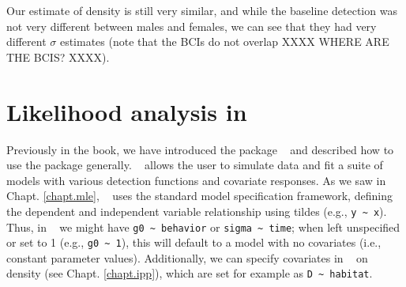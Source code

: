 Our estimate of density is still very similar, and while the baseline detection was not very different
between males and females, we can see that they had very different $\sigma$ estimates (note that the BCIs do not
overlap XXXX WHERE ARE THE BCIS? XXXX).  




\section{Likelihood analysis in \secr}

\begin{comment}
XXX THIS ENTIRE PARAGRAPH IS UNCLEAR - WHY IS IT THERE AND WHAT DOES IT WANT TO SAY? XXXX

Before we describe the types of covariates and demonstrate how to
implement them, a brief note about the different inference approaches.
In taking a Bayesian approach to analysis of covariate models,
inference is always based on analysis of the ``joint likelihood''
based on data augmentation. That is, the conditional-on-N likelihood,
with $N$ removed by integration (as described in
Chapt. \ref{chapt.closed} XXXXXX specific section XXXXX).
However, likelihood analysis
based on the conditional likelihood is often done in practice and, in
particular, in the {\tt secr} package. XXX THIS SENTENCE ISNT CLEAR TO ME XXXX A variant of the conditional
likelihood which is kind of distinct and relevant to the individual
covariates is the ``Huggins-Alho'' idea which is based on thinking
about Horwitz-Thompson estimators involving unequal probabilities of
sampling. XXX I DONT THINK THIS MEANS ANYTHING TO MOST READERS WITHOUT ADDITIONAL EXPLANATION XXX 
\end{comment}

Previously in the book, we have introduced the \R package \secr~ and described how
to use the package generally. 
 \secr~ allows the user to simulate data and fit a
suite of models with various detection functions and covariate
responses.  As we saw in Chapt. \ref{chapt.mle}, \secr~ uses the standard \R model
specification framework, defining the dependent and independent
variable relationship using tildes
(e.g., \Verb+y ~ x+).
Thus, in \secr~ we
might have \verb+g0 ~ behavior+ or \verb+sigma ~ time+;
when left unspecified or set
to 1 (e.g., \verb+g0 ~ 1+), this will default to a model with no
covariates
(i.e., constant parameter values).
Additionally, we can specify covariates in \secr~
on density (see Chapt. \ref{chapt.ipp}),
which are set for example as \verb+D ~ habitat+.

